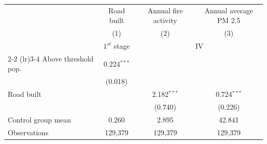 
\begingroup
\centering
\begin{tabular}{lccc}
   \toprule
                        & Road built    & Annual fire activity & Annual average PM 2.5\\  
                        & (1)           & (2)                  & (3)\\  
    & $1^{st}$ stage & \multicolumn{2}{c}{IV} \\ \cmidrule(lr){2-2} \cmidrule(lr){3-4}
   \midrule 
   Above threshold pop. & 0.224$^{***}$ &                      &   \\   
                        & (0.018)       &                      &   \\   
   Road built           &               & 2.182$^{***}$        & 0.724$^{***}$\\   
                        &               & (0.740)              & (0.226)\\   
   \midrule 
   Control group mean   & 0.260         & 2.895                & 42.841\\  
   Observations         & 129,379       & 129,379              & 129,379\\  
   \bottomrule
\end{tabular}
\par\endgroup


